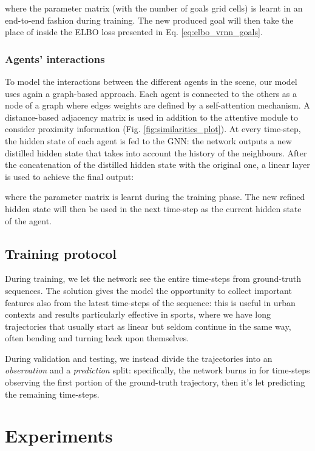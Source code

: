 \documentclass[10pt,a4paper,conference]{IEEEtran}
\begin{document}
where the parameter matrix  (with  the number of goals grid cells) is learnt in an end-to-end fashion during training. The new produced goal  will then take the place of  inside the ELBO loss presented in Eq. \eqref{eq:elbo_vrnn_goals}.

\subsubsection{Agents' interactions}
To model the interactions between the different agents in the scene, our model uses again a graph-based approach. Each agent is connected to the others as a node of a graph where edges weights are defined by a self-attention mechanism. A distance-based adjacency matrix is used in addition to the attentive module to consider proximity information (Fig. \ref{fig:similarities_plot}). At every time-step, the hidden state  of each agent is fed to the GNN: the network outputs a new distilled hidden state  that takes into account the history of the neighbours. After the concatenation of the distilled hidden state with the original one, a linear layer is used to achieve the final output:


where the parameter matrix  is learnt during the training phase. The new refined hidden state  will then be used in the next time-step as the current hidden state of the agent.

\subsection{Training protocol}

During training, we let the network see the entire  time-steps from ground-truth sequences. The solution gives the model the opportunity to collect important features also from the latest time-steps of the sequence: this is useful in urban contexts and results particularly effective in sports, where we have long trajectories that usually start as linear but seldom continue in the same way, often bending and turning back upon themselves.


During validation and testing, we instead divide the trajectories into an \textit{observation} and a \textit{prediction} split: specifically, the network burns in for  time-steps observing the first portion of the ground-truth trajectory, then it's let predicting the remaining  time-steps. \section{Experiments}
\end{document}
